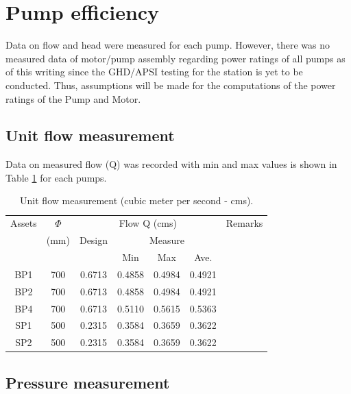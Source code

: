 \section{Pump efficiency} \label{ch04mech03}
Data on flow and head were measured for each pump. However, there was no measured data of motor/pump assembly regarding power ratings of all pumps as of this writing since the GHD/APSI testing for the station is yet to be conducted. Thus, assumptions will be made for the computations of the power ratings of the Pump and Motor.

\subsection{Unit flow measurement} \label{ch04mech04}
Data on measured flow (Q) was recorded with min and max values is shown in Table \ref{ch04_tbl_flow01} for each pumps. %

\begin{table}[!h]
	\caption{Unit flow measurement (cubic meter per second - cms).}
	\label{ch04_tbl_flow01}
	{\footnotesize
\begin{tabular}{c|c|c|c|c|c|l}
	\hline
Assets & $\Phi$  & \multicolumn{4}{c|}{Flow Q (cms)} & \multicolumn{1}{c}{Remarks} \\ 
\cline{3-6}
 & (mm) & Design & \multicolumn{3}{c|}{Measure} & \multicolumn{1}{c}{} \\ 
\cline{4-6}
 &  &  & Min & Max & Ave. & \multicolumn{1}{c}{} \\ 
\hline
BP1 & 700 & 0.6713 & 0.4858 & 0.4984 & 0.4921 & \multicolumn{1}{c}{} \\ 
BP2 & 700 & 0.6713 & 0.4858 & 0.4984 & 0.4921 & \multicolumn{1}{c}{} \\ 
BP4 & 700 & 0.6713 & 0.5110 & 0.5615 & 0.5363 & \multicolumn{1}{c}{} \\ 
SP1 & 500 & 0.2315 & 0.3584 & 0.3659 & 0.3622 & \multicolumn{1}{c}{} \\ 
SP2 & 500 & 0.2315 & 0.3584 & 0.3659 & 0.3622 & \multicolumn{1}{c}{} \\ 
\hline
\end{tabular}

	}
\end{table}

\subsection{Pressure measurement} \label{ch04pressure}

